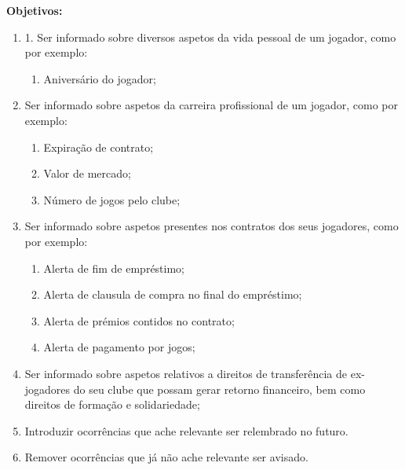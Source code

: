 \textbf{Objetivos:}
\begin{enumerate}
    \item 1.	Ser informado sobre diversos aspetos da vida pessoal de um jogador, como por exemplo:
    \begin{enumerate}
        \item Aniversário do jogador;
    \end{enumerate}
    \item Ser informado sobre aspetos da carreira profissional de um jogador, como por exemplo:
    \begin{enumerate}
        \item Expiração de contrato;
        \item Valor de mercado;
        \item Número de jogos pelo clube;
    \end{enumerate}
    \item Ser informado sobre aspetos presentes nos contratos dos seus jogadores, como por exemplo:
    \begin{enumerate}
        \item Alerta de fim de empréstimo;
        \item Alerta de clausula de compra no final do empréstimo;
        \item Alerta de prémios contidos no contrato;
        \item Alerta de pagamento por jogos;
    \end{enumerate}
    \item Ser informado sobre aspetos relativos a direitos de transferência de ex-jogadores do seu clube que possam gerar retorno financeiro, bem como direitos de formação e solidariedade;
    \item Introduzir ocorrências que ache relevante ser relembrado no futuro. 
    \item Remover ocorrências que já não ache relevante ser avisado.
\end{enumerate}